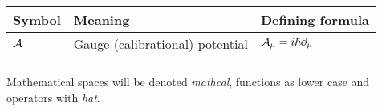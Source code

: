 

\begin{tabular} {@{}C{1.9cm}@{}p{8cm}@{}C{3.77cm}}
	\toprule
	\textbf{Symbol}& \textbf{Meaning}& \textbf{Defining formula}\\\bottomrule
	$\mathcal{A}$ & Gauge (calibrational) potential & $\mathcal{A}_\mu=i\hbar \partial_\mu$ \\

\bottomrule
{}
\end{tabular}

Mathematical spaces will be denoted \emph{mathcal}, functions as lower case and operators with \emph{hat}.